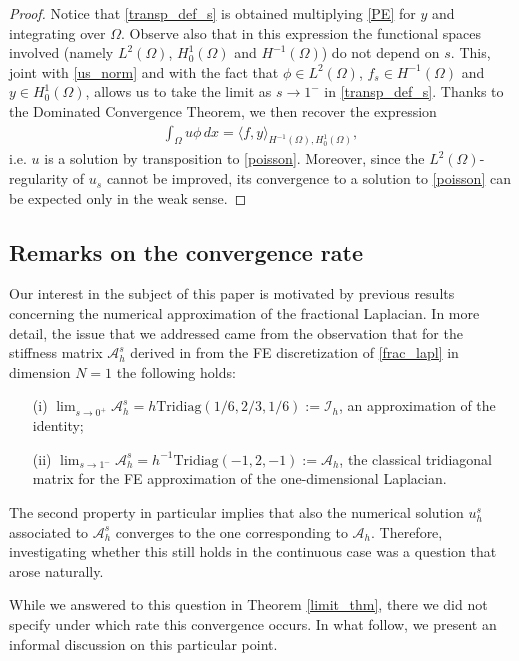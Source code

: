 \documentclass[reqno,twoside]{amsart}
\numberwithin{equation}{section}
\begin{document}
\begin{proof}
Notice that \eqref{transp_def_s} is obtained multiplying \eqref{PE} for $y$ and integrating over $\Omega$. Observe also that in this expression the functional spaces involved (namely $L^2(\Omega)$, $H_0^1(\Omega)$ and $H^{-1}(\Omega)$) do not depend on $s$. This, joint with \eqref{us_norm} and with the fact that $\phi\in L^2(\Omega)$, $f_s\in H^{-1}(\Omega)$ and $y\in H_0^1(\Omega)$, allows us to take the limit as $s\to 1^-$ in \eqref{transp_def_s}. Thanks to the Dominated Convergence Theorem, we then recover the expression
\begin{align}\label{transp_def}
	\int_\Omega u\phi\,dx = \langle f,y\rangle_{H^{-1}(\Omega),H^1_0(\Omega)},
\end{align}
i.e. $u$ is a solution by transposition to \eqref{poisson}. Moreover, since the $L^2(\Omega)$-regularity of $u_s$ cannot be improved, its convergence to a solution to \eqref{poisson} can be expected only in the weak sense.
\end{proof}

\subsection{Remarks on the convergence rate}

Our interest in the subject of this paper is motivated by previous results concerning the numerical approximation of the fractional Laplacian. In more detail, the issue that we addressed came from the observation that for the stiffness matrix $\mathcal A_h^s$ derived in \cite{biccari2017controllability} from the FE discretization of \eqref{frac_lapl} in dimension $N=1$  the following holds:
\begin{itemize}
	\item[(i)] $\lim_{s\to 0^+}\mathcal A_h^s = h\textrm{Tridiag}(1/6,2/3,1/6):=\mathcal I_h$, an approximation of the identity;
	
	\item[(ii)] $\lim_{s\to 1^-}\mathcal A_h^s = h^{-1}\textrm{Tridiag}(-1,2,-1):=\mathcal A_h$, the classical tridiagonal matrix for the FE approximation of the one-dimensional Laplacian.
\end{itemize}

The second property in particular implies that also the numerical solution $u_h^s$ associated to $\mathcal A_h^s$ converges to the one corresponding to $\mathcal A_h$. Therefore, investigating whether this still holds in the continuous case was a question that arose naturally. 

While we answered to this question in Theorem \ref{limit_thm}, there we did not specify under which rate this convergence occurs. In what follow, we present an informal discussion on this particular point. 
\end{document}
